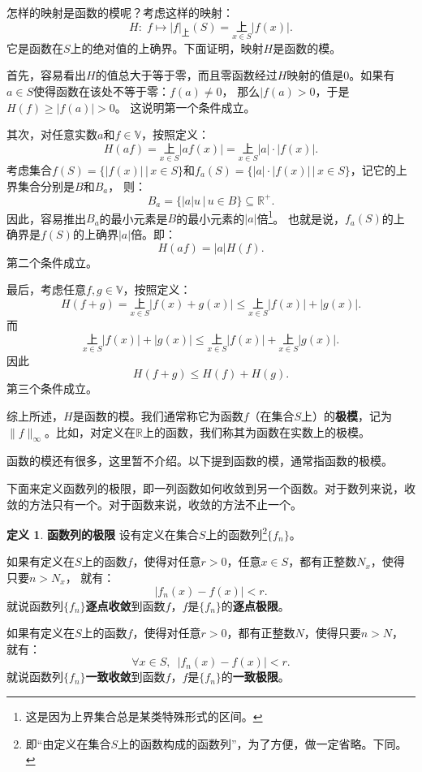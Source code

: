 \documentclass[12pt,UTF8]{ctexbook}
\theoremstyle{definition}
\newtheorem{df}{定义}[section]
\theoremstyle{plain}
\begin{document}
\begin{appendix}
怎样的映射是函数的模呢？考虑这样的映射：
$$ H:\; f \mapsto |f|_{\text{上}}(S) = \underset{x\in S}{\text{上}} |f(x)|. $$
它是函数在$S$上的绝对值的上确界。下面证明，映射$H$是函数的模。

首先，容易看出$H$的值总大于等于零，而且零函数经过$H$映射的值是$0$。如果有$a\in S$使得函数在该处不等于零：$f(a)\neq 0$，
那么$|f(a)>0$，于是$H(f) \geqslant |f(a)| > 0$。
这说明第一个条件成立。

其次，对任意实数$a$和$f\in\mathbb{V}$，按照定义：
$$ H(af) = \underset{x\in S}{\text{上}} |af(x)| = \underset{x\in S}{\text{上}} |a|\cdot |f(x)|. $$
考虑集合$f(S) = \{ |f(x)| \, | \, x\in S\}$和$f_a(S) = \{|a|\cdot |f(x)| \, | \, x\in S\}$，记它的上界集合分别是$B$和$B_a$，
则：
$$ B_a = \{|a| u \, | \, u \in B\} \subseteq \mathbb{R}^+. $$
因此，容易推出$B_a$的最小元素是$B$的最小元素的$|a|$倍\footnote{这是因为上界集合总是某类特殊形式的区间。}。
也就是说，$f_a(S)$的上确界是$f(S)$的上确界$|a|$倍。即：
$$ H(af) = |a| H(f). $$
第二个条件成立。

最后，考虑任意$f,g \in \mathbb{V}$，按照定义：
$$ H(f + g) = \underset{x\in S}{\text{上}} |f(x) + g(x)| \leqslant \underset{x\in S}{\text{上}} |f(x)| + |g(x)|. $$
而
$$ \underset{x\in S}{\text{上}} |f(x)| + |g(x)| \leqslant \underset{x\in S}{\text{上}} |f(x)| + \underset{x\in S}{\text{上}}|g(x)|.$$
因此
$$ H(f + g) \leqslant H(f) + H(g).$$
第三个条件成立。

综上所述，$H$是函数的模。我们通常称它为函数$f$（在集合$S$上）的\textbf{极模}，记为$\|f\|_{\infty}$。比如，对定义在$\mathbb{R}$上的函数，我们称其为函数在实数上的极模。

函数的模还有很多，这里暂不介绍。以下提到函数的模，通常指函数的极模。

下面来定义函数列的极限，即一列函数如何收敛到另一个函数。对于数列来说，收敛的方法只有一个。对于函数来说，收敛的方法不止一个。

\begin{df}{\textbf{函数列的极限}}
    设有定义在集合$S$上的函数列\footnote{即“由定义在集合$S$上的函数构成的函数列”，为了方便，做一定省略。下同。}$\{f_n\}$。
    
    如果有定义在$S$上的函数$f$，使得对任意$r>0$，任意$x\in S$，都有正整数$N_x$，使得只要$n>N_x$，
    就有：
    $$ |f_n(x) - f(x) | < r.$$
    就说函数列$\{f_n\}$\textbf{逐点收敛}到函数$f$，$f$是$\{f_n\}$的\textbf{逐点极限}。

    如果有定义在$S$上的函数$f$，使得对任意$r>0$，都有正整数$N$，使得只要$n>N$，
    就有：
    $$ \forall x\in S, \,\,\,|f_n(x) - f(x) | < r.$$
    就说函数列$\{f_n\}$\textbf{一致收敛}到函数$f$，$f$是$\{f_n\}$的\textbf{一致极限}。


\end{df}
\end{appendix}
\end{document}
